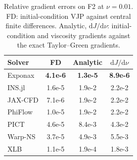 \begin{table}[t]
  \small
  \begin{minipage}[c]{0.5\linewidth}
  \centering
  \begin{tabular}{@{}l c c c@{}}
    \toprule
    \textbf{Solver} & \textbf{FD} & \textbf{Analytic} & $\mathrm{d}J/\mathrm{d}\nu$ \\
    \midrule
      Exponax & \textbf{4.1e-6} & \textbf{1.3e-5} & \textbf{8.9e-6} \\
      INS.jl & 1.6e-5 & 1.9e-2 & 2.2e-2 \\
      JAX-CFD & 7.1e-6 & 1.9e-2 & 2.2e-2 \\
      PhiFlow & 1.0e-5 & 1.9e-2 & 2.2e-2 \\
      PICT & 4.6e-5 & 8.4e-3 & 4.3e-2 \\
      Warp-NS & 3.7e-5 & 4.9e-3 & 5.5e-3 \\
      XLB & 1.1e-5 & 1.9e-4 & 1.8e-3 \\
    \bottomrule
  \end{tabular}
  \end{minipage}\hfill
  \begin{minipage}[c]{0.46\linewidth}
  \caption{Relative gradient errors on F2 at $\nu{=}0.01$. FD: initial-condition VJP
    against central finite differences. Analytic, $\mathrm{d}J/\mathrm{d}\nu$:
    initial-condition and viscosity gradients against the exact Taylor--Green gradients.}
  \label{tab:gradchecks}
  \end{minipage}
\end{table}
